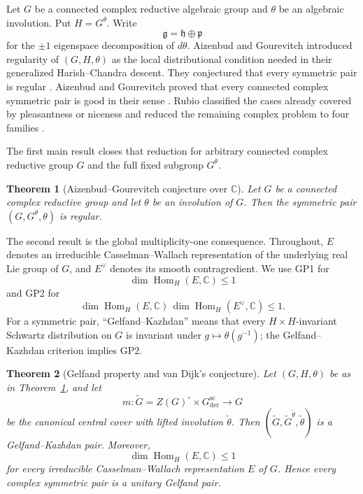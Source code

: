 \documentclass[11pt,reqno]{amsart}
\numberwithin{equation}{section}
\newtheorem{theorem}{Theorem}[section]
\theoremstyle{definition}
\theoremstyle{remark}
\newcommand{\C}{\mathbb C}
\newcommand{\Hom}{\operatorname{Hom}}
\newcommand{\fg}{\mathfrak g}
\newcommand{\fh}{\mathfrak h}
\newcommand{\fp}{\mathfrak p}
\begin{document}
Let $G$ be a connected complex reductive algebraic group and $\theta$ be an
algebraic involution. Put $H=G^\theta$.  Write
\[
  \fg=\fh\oplus\fp
\]
for the $\pm1$ eigenspace decomposition of $d\theta$.  Aizenbud and Gourevitch
introduced regularity of $(G,H,\theta)$ as the local distributional condition
needed in their generalized Harish--Chandra descent.  They conjectured that
every symmetric pair is regular \cite[Conjecture~4]{AG09}.  Aizenbud and
Gourevitch proved that every connected complex symmetric pair is good in their
sense \cite[Corollary~7.1.7]{AG09}.  Rubio classified the cases already covered
by pleasantness or niceness and reduced the remaining complex problem to four
families \cite[Proposition~6.3]{Rubio}.

The first main result closes that reduction for arbitrary connected complex reductive group 
$G$ and the full fixed subgroup $G^\theta$.

\begin{theorem}[Aizenbud--Gourevitch conjecture over $\C$]\label{thm:regularity-all}
Let $G$ be a connected complex reductive group and let $\theta$ be an
involution of $G$.  Then the symmetric pair $(G,G^\theta,\theta)$ is regular.
\end{theorem}

The second result is the global multiplicity-one consequence.  Throughout,
$E$ denotes an irreducible Casselman--Wallach representation of the underlying
real Lie group of $G$, and $E^\vee$ denotes its smooth contragredient.  We use
GP1 for
\[
  \dim\Hom_H(E,\C)\leq1
\]
and GP2 for
\[
  \dim\Hom_H(E,\C)\,\dim\Hom_H(E^\vee,\C)\leq1.
\]
For a symmetric pair, ``Gelfand--Kazhdan'' means that every
$H\times H$-invariant Schwartz distribution on $G$ is invariant under
$g\mapsto\theta(g^{-1})$; the Gelfand--Kazhdan criterion implies GP2.

\begin{theorem}[Gelfand property and van Dijk's conjecture]\label{thm:gelfand-all}
Let $(G,H,\theta)$ be as in Theorem~\ref{thm:regularity-all}, and let
\[
 m:\widetilde G=Z(G)^\circ\times G_{\mathrm{der}}^{\mathrm{sc}}
   \longrightarrow G
\]
be the canonical central cover with lifted involution $\widetilde\theta$.
Then $(\widetilde G,\widetilde G^{\widetilde\theta},\widetilde\theta)$
is a Gelfand--Kazhdan pair.  Moreover,
\[
  \dim\Hom_H(E,\C)\leq 1
\]
for every irreducible Casselman--Wallach representation $E$ of $G$.  Hence every
complex symmetric pair is a unitary Gelfand pair.
\end{theorem}
\end{document}
